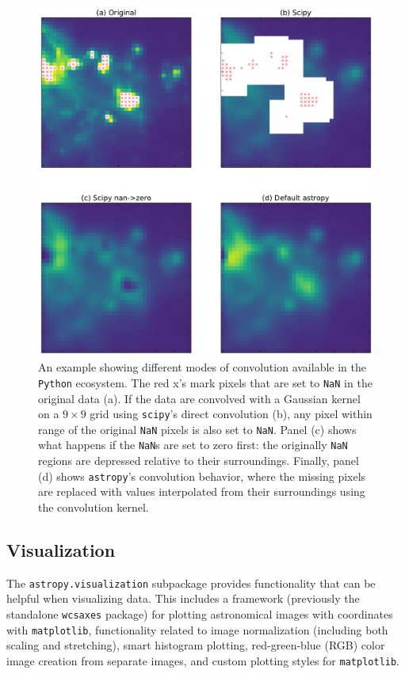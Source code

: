 \documentclass[modern]{aastex61}
\newcommand{\package}[1]{\texttt{#1}\xspace}
\newcommand{\python}{\package{Python}}
\newcommand{\astropypkg}{\package{astropy}}
\begin{document}
\begin{figure}
\includegraphics[width=\textwidth]{convolution_example}
\caption{%
    An example showing different modes of convolution available in the \python
    ecosystem.  The red x's mark pixels that are set to \texttt{NaN} in the
    original data (a).  If the data are convolved with a Gaussian kernel on a
    $9\times 9$ grid using
    \package{scipy}'s direct convolution (b), any pixel within range of the original \texttt{NaN}
    pixels is also set to \texttt{NaN}.  Panel (c) shows what happens if the
    \texttt{NaN}s are set to zero first: the originally \texttt{NaN} regions are
    depressed relative to their surroundings.  Finally, panel (d) shows
    \astropypkg's convolution behavior, where the missing pixels are replaced
    with values interpolated from their surroundings using the convolution
    kernel.
    \label{fig:convolution-example}
}
\end{figure}


\subsection{Visualization}

The \package{astropy.visualization} subpackage provides functionality that can
be helpful when visualizing data. This includes a framework (previously the
standalone \package{wcsaxes} package) for plotting
astronomical images with coordinates with \package{matplotlib}, functionality related to image
normalization (including both scaling and stretching), smart histogram
plotting, red-green-blue (RGB) color image creation from separate images,
and custom plotting styles for \package{matplotlib}.
\end{document}
